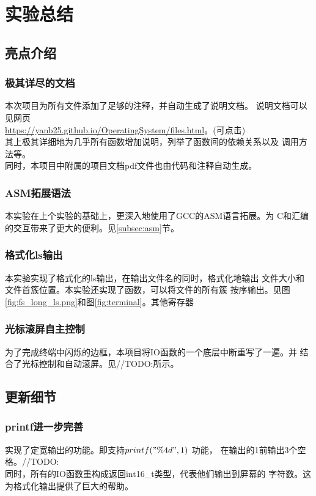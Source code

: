 \documentclass[a4paper]{article}
\begin{document}
\section{实验总结}
    \subsection{亮点介绍}
    \subsubsection{极其详尽的文档}
    本次项目为所有文件添加了足够的注释，并自动生成了说明文档。
    说明文档可以见网页\\ 

    \url{https://yanb25.github.io/OperatingSystem/files.html}。(可点击) \\

    其上极其详细地为几乎所有函数增加说明，列举了函数间的依赖关系以及
    调用方法等。\\
    
    同时，本项目中附属的项目文档pdf文件也由代码和注释自动生成。
    \subsubsection{ASM拓展语法}
    本实验在上个实验的基础上，更深入地使用了GCC的ASM语言拓展。为
    C和汇编的交互带来了更大的便利。见\ref{subsec:asm}节。
    \subsubsection{格式化ls输出}
    本实验实现了格式化的ls输出，在输出文件名的同时，格式化地输出
    文件大小和文件首簇位置。本实验还实现了函数，可以将文件的所有簇
    按序输出。见图\ref{fig:fs_long_ls.png}和图\ref{fig:terminal}。其他寄存器
    \subsubsection{光标滚屏自主控制}
    为了完成终端中闪烁的边框，本项目将IO函数的一个底层中断重写了一遍。并
    结合了光标控制和自动滚屏。见//TODO:所示。

    \subsection{更新细节}
    \subsubsection{printf进一步完善}
    实现了定宽输出的功能。即支持$ printf("\%4d", 1) $ 功能，
    在输出的1前输出3个空格。//TODO:
    \\
    同时，所有的IO函数重构成返回int16\_t类型，代表他们输出到屏幕的
    字符数。这为格式化输出提供了巨大的帮助。
\end{document}

